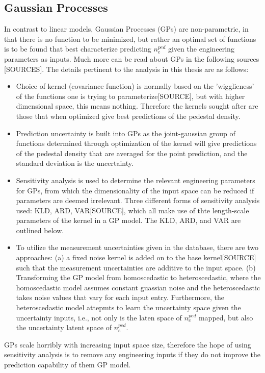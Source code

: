 \documentclass[a4paper, twoside, final, 12pt]{article}
\begin{document}
\subsection{Gaussian Processes}
In contrast to linear models, Gaussian Processes (GPs) are non-parametric, in that there is no function to be minimized, but rather an optimal set of functions is to be found that best characterize predicting $n_e^{ped}$ given the engineering parameters as inputs.
Much more can be read about GPs in the following sources [SOURCES].
The details pertinent to the analysis in this thesis are as follows:
\begin{itemize}
	\item Choice of kernel (covariance function) is normally based on the 'wigglieness' of the functions one is trying to parameterize[SOURCE], but with higher dimensional space, this means nothing. Therefore the kernels sought after are those that when optimized give best predictions of the pedestal density.
	\item Prediction uncertainty is built into GPs as the joint-gaussian group of functions determined through optimization of the kernel will give predictions of the pedestal density that are averaged for the point prediction, and the standard deviation is the uncertainty. 
	\item Sensitivity analysis is used to determine the relevant engineering parameters for GPs, from which the dimensionality of the input space can be reduced if parameters are deemed irrelevant. Three different forms of sensitivity analysis used: KLD, ARD, VAR[SOURCE], which all make use of thte length-scale parameters of the kernel in a GP model. The KLD, ARD, and VAR are outlined below. 
	\item To utilize the measurement uncertainties given in the database, there are two approaches: (a) a fixed noise kernel is added on to the base kernel[SOURCE] such that the measurement uncertainties are additive to the input space. (b) Transforming the GP model from homoscedastic to heteroscedastic, where the homoscedastic model assumes constant guassian noise and the heteroscedastic takes noise values that vary for each input entry. Furthermore, the heteroscedastic model attepmts to learn the uncertainty space given the uncertainty inputs, i.e., not only is the laten space of $n_e^{ped}$ mapped, but also the uncertainty latent space of $n_e^{ped}$.   
\end{itemize}

GPs scale horribly with increasing input space size, therefore the hope of using sensitivity analysis is to remove any engineering inputs if they do not improve the prediction capability of them GP model.
\end{document}
